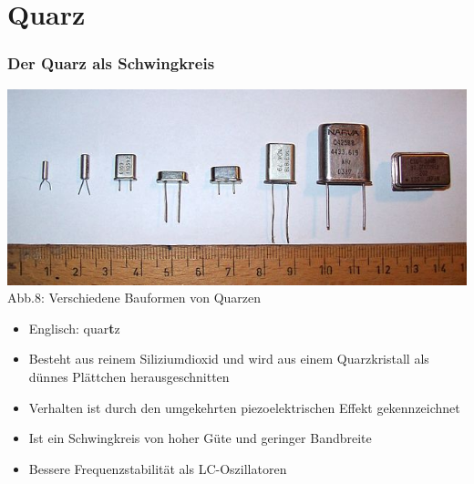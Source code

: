 \section*{Quarz}
\begin{frame}
  \frametitle{Der Quarz als Schwingkreis}
  \begin{center}
    \includegraphics[width=\textwidth,height=.4\textheight,keepaspectratio]{a04/Quartz.jpg}\\
    {\tiny Abb.8: Verschiedene Bauformen von Quarzen}
  \end{center}
  \begin{itemize}
    \item Englisch: quar\textbf{t}z
    \item Besteht aus reinem Siliziumdioxid und wird aus einem Quarzkristall als dünnes Plättchen herausgeschnitten
    \item Verhalten ist durch den umgekehrten piezoelektrischen Effekt gekennzeichnet
    \item Ist ein Schwingkreis von hoher Güte und geringer Bandbreite
    \item Bessere Frequenzstabilität als LC-Oszillatoren
  \end{itemize}
\end{frame}

